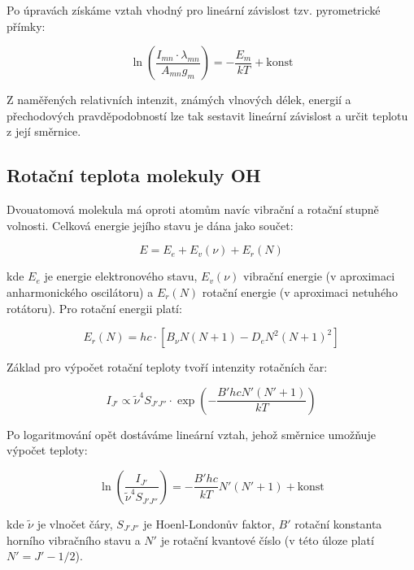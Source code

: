 \documentclass[czech,11pt,a4paper]{article}
\begin{document}
\begin{multicols}{2}
		
		Po úpravách získáme vztah vhodný pro lineární závislost tzv. pyrometrické přímky:
		
		
		\begin{equation}
			\ln\left(\frac{I_{mn} \cdot \lambda_{mn}}{A_{mn} g_m}\right) = -\frac{E_m}{kT} + \text{konst}
		\end{equation}
		
		
		Z naměřených relativních intenzit, známých vlnových délek, energií a přechodových pravděpodobností lze tak sestavit lineární závislost a určit teplotu z její směrnice.
		
		\subsection{Rotační teplota molekuly OH}
		
		Dvouatomová molekula má oproti atomům navíc vibrační a rotační stupně volnosti. Celková energie jejího stavu je dána jako součet:
		
		
		\begin{equation}
			E = E_e + E_v(\nu) + E_r(N)
		\end{equation}
		
		
		kde $E_e$ je energie elektronového stavu, $E_v(\nu)$ vibrační energie (v aproximaci anharmonického oscilátoru) a $E_r(N)$ rotační energie (v aproximaci netuhého rotátoru). Pro rotační energii platí:
		
		
		\begin{equation}
			E_r(N) = hc \cdot \left[B_\nu N(N+1) - D_e N^2(N+1)^2\right]
		\end{equation}
		
		
		Základ pro výpočet rotační teploty tvoří intenzity rotačních čar:
		
		
		\begin{equation}
			I_{J'} \propto \tilde{\nu}^4 S_{J'J''} \cdot \exp\left(-\frac{B' hc N'(N'+1)}{kT}\right)
		\end{equation}
		
		
		Po logaritmování opět dostáváme lineární vztah, jehož směrnice umožňuje výpočet teploty:
		
		
		\begin{equation}
			\ln\left(\frac{I_{J'}}{\tilde{\nu}^4 S_{J'J''}}\right) = -\frac{B' hc}{kT} N'(N'+1) + \text{konst}
		\end{equation}
		
		
		kde $\tilde{\nu}$ je vlnočet čáry, $S_{J'J''}$ je Hoenl-Londonův faktor, $B'$ rotační konstanta horního vibračního stavu a $N'$ je rotační kvantové číslo (v této úloze platí $N' = J' - 1/2$).
		

\end{multicols}
\end{document}
